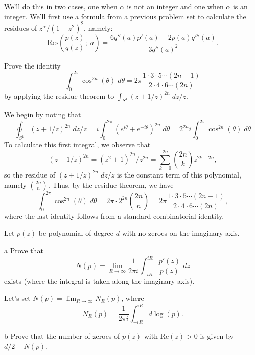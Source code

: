 \documentclass{pset}
\begin{document}
\begin{solution}
  We'll do this in two cases, one when $\alpha$ is not an integer and one when $\alpha$ is an integer. We'll first use a formula from a previous problem set to calculate the residues of $z^\alpha / (1+z^2)^2$, namely:
  \[
    \textrm{Res}\left(\frac{p(z)}{q(z)};\; a\right) = \frac{6q''(a)p'(a) - 2p(a)q'''(a)}{3q''(a)^2}.
  \]
\end{solution}

\begin{problem}{25}
  Prove the identity
  \[
    \int^{2\pi}_{0} \cos^{2n}(\theta)\;d\theta = 2\pi \frac{1\cdot 3\cdot 5\cdots (2n-1)}{2\cdot 4\cdot 6\cdots (2n)}
  \]
  by applying the residue theorem to $\int_{S^1} (z+1 /z)^{2n}\;dz/z$.
\end{problem}

\begin{solution}
  We begin by noting that
  \[
    \oint_{S^1} (z+1/z)^{2n}\;dz/z = i\int_0^{2\pi} (e^{i\theta} + e^{-i\theta})^{2n}\;d\theta = 2^{2n}i\int_0^{2\pi} \cos^{2n}(\theta)\;d\theta
  \]
  To calculate this first integral, we observe that
  \[(z+1/z)^{2n} = (z^2+1)^{2n}/z^{2n} = \sum^{2n}_{k=0}{\binom{2n}{k}} z^{2k-2n},\]
  so the residue of $(z+1/z)^{2n}\;dz/z$ is the constant term of this polynomial, namely $\binom{2n}{n}$. Thus, by the residue theorem, we have
  \[\int_{0}^{2\pi} \cos^{2n}(\theta)\;d\theta = 2\pi \cdot 2^{2n} \binom{2n}{n} = 2\pi\frac{1\cdot 3\cdot 5\cdots (2n-1)}{2\cdot 4\cdot 6\cdots (2n)},\]
  where the last identity follows from a standard combinatorial identity.
\end{solution}

\begin{problem}{27}
  Let $p(z)$ be polynomial of degree $d$ with no zeroes on the imaginary axis. 
\end{problem}

\begin{parts}
  \begin{part}{a}
    Prove that
    \[
      N(p)=\lim_{R \to \infty}\frac{1}{2\pi i}\int^{iR}_{-iR}\frac{p'(z)}{p(z)}\;dz
    \]
    exists (where the integral is taken along the imaginary axis).
  \end{part}
  Let's set $N(p)=\lim_{R\to \infty} N_R(p)$, where
  \[N_R(p) = \frac{1}{2\pi i}\int_{-iR}^{iR}d\log(p).\]

  \begin{part}{b}
    Prove that the number of zeroes of $p(z)$ with $\textrm{Re}(z)>0$ is given by $d /2 - N(p)$.
  \end{part}
\end{parts}
\end{document}
